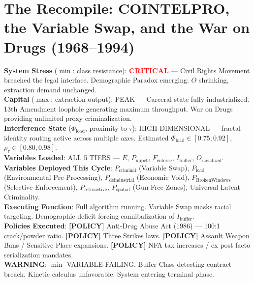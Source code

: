 \chapter{The Recompile: COINTELPRO, the Variable Swap, and the War on Drugs (1968--1994)}
\label{ch:recompile}

\begin{tcolorbox}[colback=black!5, colframe=black!70, fonttitle=\bfseries\ttfamily, title=RUNTIME LOG: 1968--1994 (THE RECOMPILE)]
\ttfamily\small
\textbf{System Stress} ($\min$: class resistance): \textcolor{red}{\textbf{CRITICAL}} --- Civil Rights Movement breached the legal interface. Demographic Paradox emerging: $O$ shrinking{,} extraction demand unchanged.\\
\textbf{Capital} ($\max$: extraction output): PEAK --- Carceral state fully industrialized. 13th Amendment loophole generating maximum throughput. War on Drugs providing unlimited proxy criminalization.\\
\textbf{Interference State} ($\Phi_{\text{load}}$, proximity to $\tau$): HIGH-DIMENSIONAL --- fractal identity routing active across multiple axes. Estimated $\Phi_{\text{load}} \in [0.75, 0.92]$, $\rho_{\tau} \in [0.80, 0.98]$.\\
\textbf{Variables Loaded}: ALL 5 TIERS --- $E$, $P_{\text{uppet}}$, $F_{\text{enforce}}$, $I_{\text{buffer}}$, $O_{\text{racialized}}$.\\
\textbf{Variables Deployed This Cycle}: $P_{\text{criminal}}$ (Variable Swap), $P_{\text{lead}}$ (Environmental Pre-Processing), $P_{\text{deindustrial}}$ (Economic Void), $P_{\text{BrokenWindows}}$ (Selective Enforcement), $P_{\text{retroactive}}$, $P_{\text{spatial}}$ (Gun-Free Zones), Universal Latent Criminality.\\
\textbf{Executing Function}: Full algorithm running. Variable Swap masks racial targeting. Demographic deficit forcing cannibalization of $I_{\text{buffer}}$.\\
\textbf{Policies Executed}: \textbf{[POLICY]} Anti-Drug Abuse Act (1986) --- 100:1 crack/powder ratio. \textbf{[POLICY]} Three Strikes laws. \textbf{[POLICY]} Assault Weapon Bans / Sensitive Place expansions. \textbf{[POLICY]} NFA tax increases / ex post facto serialization mandates.\\
\textbf{WARNING}: $\min$ VARIABLE FAILING. Buffer Class detecting contract breach. Kinetic calculus unfavorable. System entering terminal phase.
\end{tcolorbox}

\medskip

